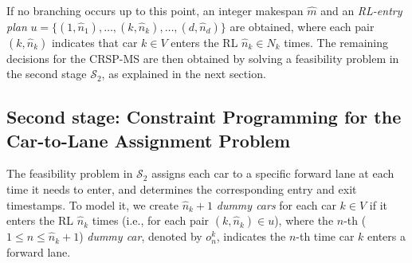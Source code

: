 \documentclass[12pt]{article}
\begin{document}
If no branching occurs up to this point, an integer makespan $\widehat{m}$ and an \textit{RL-entry plan} $u=\{(1,\widehat{n}_1),\dots,(k,\widehat{n}_k),\dots,(d,\widehat{n}_d)\}$ are obtained, where each pair $(k,\widehat{n}_k)$ indicates that car $k\in V$ enters the RL $\widehat{n}_k\in N_k$ times. The remaining decisions for the CRSP-MS are then obtained by solving a feasibility problem in the second stage $\mathcal{S}_2$, as explained in the next section.





\subsection{Second stage: Constraint Programming for the Car-to-Lane Assignment Problem}\label{sec4-3}



The feasibility problem in $\mathcal{S}_2$ assigns each car to a specific forward lane at each time it needs to enter, and determines the corresponding entry and exit timestamps. To model it, we create $\widehat{n}_k+1$ \textit{dummy cars} for each car $k\in V$ if it enters the RL $\widehat{n}_k$ times (i.e., for each pair $(k,\widehat{n}_k)\in u$), where the $n$-th ($1\leqslant n\leqslant \widehat{n}_k+1$) \textit{dummy car}, denoted by $o^k_n$, indicates the $n$-th time car $k$ enters a forward lane.
\end{document}
